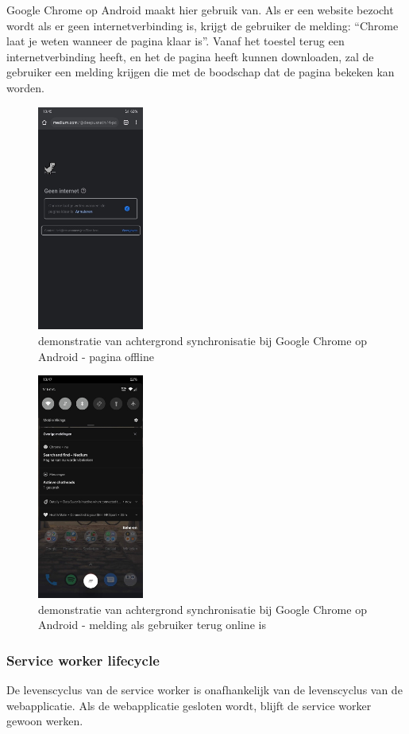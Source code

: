 		Google Chrome op Android maakt hier gebruik van. Als er een website bezocht wordt als er geen internetverbinding is, krijgt de gebruiker de melding: “Chrome laat je weten wanneer de pagina klaar is”. Vanaf het toestel terug een internetverbinding heeft, en het de pagina heeft kunnen downloaden,  zal de gebruiker een melding krijgen die met de boodschap dat de pagina bekeken kan worden.
	
	
		\begin{figure}[H]
			\centering
			\includegraphics[width=35mm]{./img/backSync1.png}{}
			\caption{demonstratie van achtergrond synchronisatie bij Google Chrome op Android - pagina offline}
		\end{figure}
		
		\begin{figure}[H]
			\centering
			\includegraphics[width=35mm]{./img/backSync2.png}
			\caption{demonstratie van achtergrond synchronisatie bij Google Chrome op Android - melding als gebruiker terug online is}
		\end{figure}
		\subsubsection{Service worker lifecycle }
			De levenscyclus van de service worker is onafhankelijk van de levenscyclus van de webapplicatie. Als de webapplicatie gesloten wordt, blijft de service worker gewoon werken.
			
